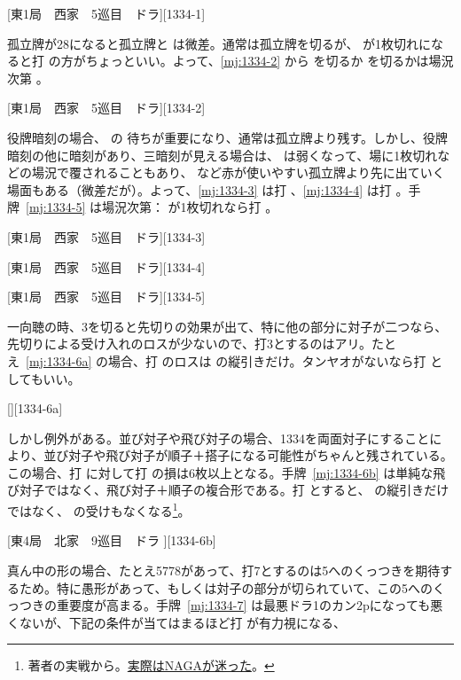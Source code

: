 \documentclass[../nankiru_main.tex]{subfiles}
\begin{document}
[東1局　西家　5巡目　ドラ][1334-1]

孤立牌が28になると孤立牌と  は微差。通常は孤立牌を切るが、 が1枚切れになると打  の方がちょっといい。よって、\ref{mj:1334-2} から  を切るか  を切るかは場況次第 \citep{yuusee-1334}。

[東1局　西家　5巡目　ドラ][1334-2]

役牌暗刻の場合、 の  待ちが重要になり、通常は孤立牌より残す。しかし、役牌暗刻の他に暗刻があり、三暗刻が見える場合は、 は弱くなって、場に1枚切れなどの場況で覆されることもあり、 など赤が使いやすい孤立牌より先に出ていく場面もある（微差だが）。よって、\ref{mj:1334-3} は打 、\ref{mj:1334-4} は打 。手牌~\ref{mj:1334-5} は場況次第： が1枚切れなら打  \citep{yuusee-1334}。

[東1局　西家　5巡目　ドラ][1334-3]

[東1局　西家　5巡目　ドラ][1334-4]

[東1局　西家　5巡目　ドラ][1334-5]

一向聴の時、3を切ると先切りの効果が出て、特に他の部分に対子が二つなら、先切りによる受け入れのロスが少ないので、打3とするのはアリ。たとえ~\ref{mj:1334-6a} の場合、打  のロスは  の縦引きだけ。タンヤオがないなら打  としてもいい。

[][1334-6a]

しかし例外がある。並び対子や飛び対子の場合、1334を両面対子にすることにより、並び対子や飛び対子が順子＋搭子になる可能性がちゃんと残されている。この場合、打  に対して打  の損は6枚以上となる。手牌~\ref{mj:1334-6b} は単純な飛び対子ではなく、飛び対子＋順子の複合形である。打  とすると、 の縦引きだけではなく、 の受けもなくなる\footnote{著者の実戦から。\href{https://naga.dmv.nico/htmls/d74ee2fcc180f30ce1bccb109223ac1827c57371d858de5d304b683696beabcfv2_2.html?tw=2}{実際はNAGAが迷った}。}。

[東4局　北家　9巡目　ドラ ][1334-6b]

真ん中の形の場合、たとえ5778があって、打7とするのは5へのくっつきを期待するため。特に愚形があって、もしくは対子の部分が切られていて、この5へのくっつきの重要度が高まる。手牌~\ref{mj:1334-7} は最悪ドラ1のカン2pになっても悪くないが、下記の条件が当てはまるほど打  が有力視になる、
\end{document}
